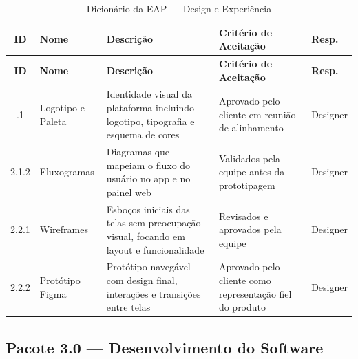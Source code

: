 \documentclass[12pt,a4paper,oneside]{report}
\begin{document}
\begin{longtable}{c p{2.5cm} p{3.5cm} p{3.5cm} p{2cm}}
\caption{Dicionário da EAP --- Design e Experiência} \\
\toprule
\textbf{ID} & \textbf{Nome} & \textbf{Descrição} & \textbf{Critério de Aceitação} & \textbf{Resp.} \\
\midrule
\endfirsthead
\toprule
\textbf{ID} & \textbf{Nome} & \textbf{Descrição} & \textbf{Critério de Aceitação} & \textbf{Resp.} \\
\midrule
\endhead
\bottomrule
\endlastfoot
2.1.1 & Logotipo e Paleta & Identidade visual da plataforma incluindo logotipo, tipografia e esquema de cores & Aprovado pelo cliente em reunião de alinhamento & Designer \\
2.1.2 & Fluxogramas & Diagramas que mapeiam o fluxo do usuário no app e no painel web & Validados pela equipe antes da prototipagem & Designer \\
2.2.1 & Wireframes & Esboços iniciais das telas sem preocupação visual, focando em layout e funcionalidade & Revisados e aprovados pela equipe & Designer \\
2.2.2 & Protótipo Figma & Protótipo navegável com design final, interações e transições entre telas & Aprovado pelo cliente como representação fiel do produto & Designer \\
\end{longtable}

\subsection{Pacote 3.0 --- Desenvolvimento do Software}
\end{document}
